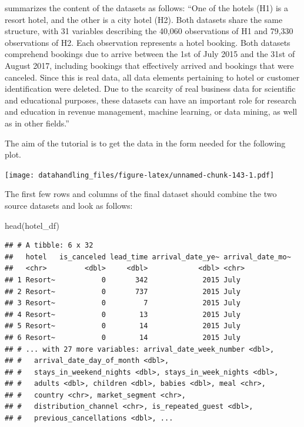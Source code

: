 \documentclass[
  12pt,
]{style/krantz}
\newenvironment{Shaded}{\begin{snugshade}}{\end{snugshade}}
\newcommand{\FunctionTok}[1]{\textcolor[rgb]{0.00,0.00,0.00}{#1}}
\newcommand{\NormalTok}[1]{#1}
\begin{document}
\citet{nuno_etal2019} summarizes the content of the datasets as follows: ``One of the hotels (H1) is a resort hotel, and the other is a city hotel (H2). Both datasets share the same structure, with 31 variables describing the 40,060 observations of H1 and 79,330 observations of H2. Each observation represents a hotel booking. Both datasets comprehend bookings due to arrive between the 1st of July 2015 and the 31st of August 2017, including bookings that effectively arrived and bookings that were canceled. Since this is real data, all data elements pertaining to hotel or customer identification were deleted. Due to the scarcity of real business data for scientific and educational purposes, these datasets can have an important role for research and education in revenue management, machine learning, or data mining, as well as in other fields.''

The aim of the tutorial is to get the data in the form needed for the following plot.

\texttt{[image: datahandling\_files/figure-latex/unnamed-chunk-143-1.pdf]}

The first few rows and columns of the final dataset should combine the two source datasets and look as follows:

\begin{Shaded}
\begin{Highlighting}[]
\FunctionTok{head}\NormalTok{(hotel\_df)}
\end{Highlighting}
\end{Shaded}

\begin{verbatim}
## # A tibble: 6 x 32
##   hotel   is_canceled lead_time arrival_date_ye~ arrival_date_mo~
##   <chr>         <dbl>     <dbl>            <dbl> <chr>           
## 1 Resort~           0       342             2015 July            
## 2 Resort~           0       737             2015 July            
## 3 Resort~           0         7             2015 July            
## 4 Resort~           0        13             2015 July            
## 5 Resort~           0        14             2015 July            
## 6 Resort~           0        14             2015 July            
## # ... with 27 more variables: arrival_date_week_number <dbl>,
## #   arrival_date_day_of_month <dbl>,
## #   stays_in_weekend_nights <dbl>, stays_in_week_nights <dbl>,
## #   adults <dbl>, children <dbl>, babies <dbl>, meal <chr>,
## #   country <chr>, market_segment <chr>,
## #   distribution_channel <chr>, is_repeated_guest <dbl>,
## #   previous_cancellations <dbl>, ...
\end{verbatim}
\end{document}
